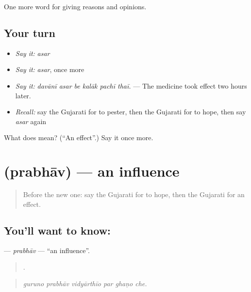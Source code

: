 \begin{grammarlens}[title={What you've built}]
One more word for giving reasons and opinions.
\end{grammarlens}

\subsection*{Your turn}
\begin{itemize}
\raggedright
  \item \emph{Say it:} \emph{asar}
  \item \emph{Say it:} \emph{asar}, once more
  \item \emph{Say it:} \emph{davānī asar be kalāk pachī thaī.} — The medicine took effect two hours later.
  \item \emph{Recall:} say the Gujarati for to pester, then the Gujarati for to hope, then say \emph{asar} again
\end{itemize}

\begin{tcolorbox}[breakable,colback=teal!4,colframe=teal!35!black,title={Before you move on}]
What does  mean? (\textquotedblleft{}An effect\textquotedblright{}.) Say it once more.
\end{tcolorbox}
\section[\texorpdfstring{\gu{પ્રભાવ} (prabhāv)}{પ્રભાવ (prabhāv)}]{ (prabhāv) — an influence}

\label{lesson:GU-C339-prabhav}



\begin{quote}
Before the new one: say the Gujarati for to hope, then the Gujarati for an effect.
\end{quote}

\subsection*{You'll want to know: }
\textbf{} — \emph{prabhāv} — \textquotedblleft{}an influence\textquotedblright{}.

\begin{quote}
     .
\end{quote}

\begin{quote}
\emph{guruno prabhāv vidyārthīo par ghaṇo che.}
\end{quote}

